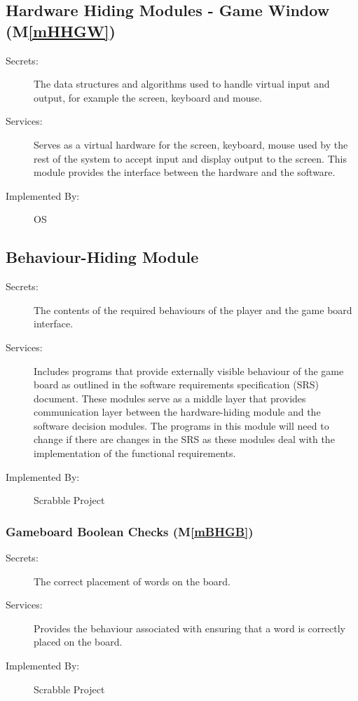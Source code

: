\documentclass[12pt, titlepage]{article}
\newcommand{\mref}[1]{M\ref{#1}}
\begin{document}
\subsection{Hardware Hiding Modules - Game Window (\mref{mHHGW})} 
\begin{description}
\item[Secrets:]The data structures and algorithms used to handle virtual input and output, for example the screen, keyboard and mouse.
\item[Services:]Serves as a virtual hardware for the screen, keyboard, mouse used by the rest of the system to accept input and display output to the screen. This module provides the interface between the hardware and the
software.
\item[Implemented By:] OS
\end{description}

\subsection{Behaviour-Hiding Module}
\begin{description}
\item[Secrets:]The contents of the required behaviours of the player and the game board interface.
\item[Services:]Includes programs that provide externally visible behaviour of
  the game board as outlined in the software requirements specification (SRS)
  document. These modules serve as a middle layer that provides communication layer between the hardware-hiding module and the software decision modules. The programs in this module will need to change if there are changes in the SRS as these modules deal with the implementation of the functional requirements.
\item[Implemented By:] Scrabble Project
\end{description}

\subsubsection{Gameboard Boolean Checks (\mref{mBHGB})}
\begin{description}
\item[Secrets:]The correct placement of words on the board.
\item[Services:]Provides the behaviour associated with ensuring that a word is correctly placed on the board. 
\item[Implemented By:] Scrabble Project
\end{description}
\end{document}

